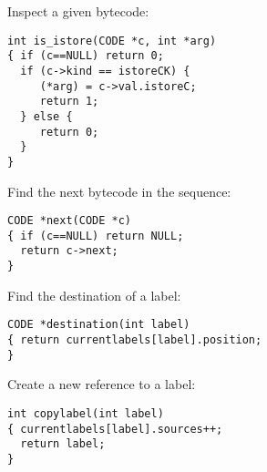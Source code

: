 \begin{slide*}
Inspect a given bytecode:

\begin{scriptsize}
\begin{verbatim}
int is_istore(CODE *c, int *arg)
{ if (c==NULL) return 0;
  if (c->kind == istoreCK) {
     (*arg) = c->val.istoreC;
     return 1;
  } else {
     return 0;
  }
}
\end{verbatim}
\end{scriptsize}

Find the next bytecode in the sequence:

\begin{scriptsize}
\begin{verbatim}
CODE *next(CODE *c)
{ if (c==NULL) return NULL;
  return c->next;
}
\end{verbatim}
\end{scriptsize}

Find the destination of a label:

\begin{scriptsize}
\begin{verbatim}
CODE *destination(int label)
{ return currentlabels[label].position;
}
\end{verbatim}
\end{scriptsize}

Create a new reference to a label:

\begin{scriptsize}
\begin{verbatim}
int copylabel(int label)
{ currentlabels[label].sources++;
  return label;
}
\end{verbatim}
\end{scriptsize}
\vfil
\end{slide*}

